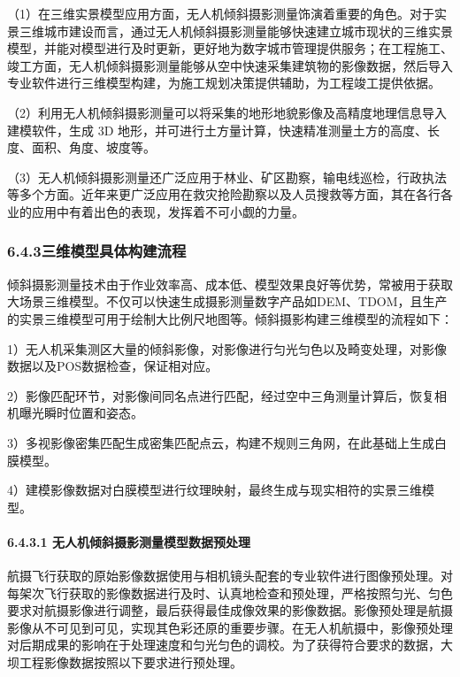 （1）在三维实景模型应用方面，无人机倾斜摄影测量饰演着重要的角色。对于实景三维城市建设而言，通过无人机倾斜摄影测量能够快速建立城市现状的三维实景模型，并能对模型进行及时更新，更好地为数字城市管理提供服务；在工程施工、竣工方面，无人机倾斜摄影测量能够从空中快速采集建筑物的影像数据，然后导入专业软件进行三维模型构建，为施工规划决策提供辅助，为工程竣工提供依据。

（2）利用无人机倾斜摄影测量可以将采集的地形地貌影像及高精度地理信息导入建模软件，生成 3D 地形，并可进行土方量计算，快速精准测量土方的高度、长度、面积、角度、坡度等。

（3）无人机倾斜摄影测量还广泛应用于林业、矿区勘察，输电线巡检，行政执法等多个方面。近年来更广泛应用在救灾抢险勘察以及人员搜救等方面，其在各行各业的应用中有着出色的表现，发挥着不可小觑的力量。

\subsubsection{6.4.3三维模型具体构建流程}\label{ux4e09ux7ef4ux6a21ux578bux5177ux4f53ux6784ux5efaux6d41ux7a0b}

倾斜摄影测量技术由于作业效率高、成本低、模型效果良好等优势，常被用于获取大场景三维模型。不仅可以快速生成摄影测量数字产品如DEM、TDOM，且生产的实景三维模型可用于绘制大比例尺地图等。倾斜摄影构建三维模型的流程如下：

1）无人机采集测区大量的倾斜影像，对影像进行匀光匀色以及畸变处理，对影像数据以及POS数据检查，保证相对应。

2）影像匹配环节，对影像间同名点进行匹配，经过空中三角测量计算后，恢复相机曝光瞬时位置和姿态。

3）多视影像密集匹配生成密集匹配点云，构建不规则三角网，在此基础上生成白膜模型。

4）建模影像数据对白膜模型进行纹理映射，最终生成与现实相符的实景三维模型。

\paragraph{6.4.3.1 无人机倾斜摄影测量模型数据预处理}\label{ux65e0ux4ebaux673aux503eux659cux6444ux5f71ux6d4bux91cfux6a21ux578bux6570ux636eux9884ux5904ux7406}

航摄飞行获取的原始影像数据使用与相机镜头配套的专业软件进行图像预处理。对每架次飞行获取的影像数据进行及时、认真地检查和预处理，严格按照匀光、匀色要求对航摄影像进行调整，最后获得最佳成像效果的影像数据。影像预处理是航摄影像从不可见到可见，实现其色彩还原的重要步骤。在无人机航摄中，影像预处理对后期成果的影响在于处理速度和匀光匀色的调校。为了获得符合要求的数据，大坝工程影像数据按照以下要求进行预处理。

